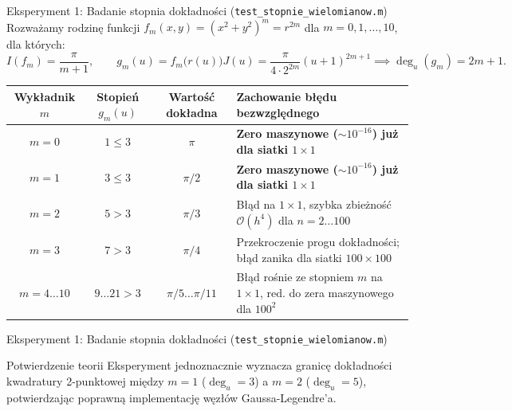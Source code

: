 \documentclass[aspectratio=169, 10pt, xcolor={table}]{beamer}
\begin{document}
\begin{frame}{Eksperyment 1: Badanie stopnia dokładności (\texttt{test\_stopnie\_wielomianow.m})}
  Rozważamy rodzinę funkcji $f_m(x,y) = (x^2 + y^2)^m = r^{2m}$ dla $m = 0, 1, \dots, 10$, dla których:
  \[
    I(f_m) = \frac{\pi}{m + 1}, \qquad g_m(u) = f_m\big(r(u)\big)J(u) = \frac{\pi}{4 \cdot 2^{2m}}(u+1)^{2m+1} \implies \deg_u(g_m) = 2m + 1.
  \]

  \begin{table}
  \centering
  \footnotesize
  \setlength{\tabcolsep}{4pt}
  \begin{tabular}{@{} c c c >{\raggedright\arraybackslash}p{6.2cm} @{}}
    \toprule
    \textbf{Wykładnik $m$} & \textbf{Stopień $g_m(u)$} & \textbf{Wartość dokładna} & \textbf{Zachowanie błędu bezwzględnego} \\
    \midrule
    \rowcolor{RowHighlight}
    $m = 0$ & $1 \le 3$ & $\pi$ & \textbf{Zero maszynowe ($\sim 10^{-16}$) już dla siatki $1 \times 1$} \\
    \rowcolor{RowHighlight}
    $m = 1$ & $3 \le 3$ & $\pi / 2$ & \textbf{Zero maszynowe ($\sim 10^{-16}$) już dla siatki $1 \times 1$} \\
    $m = 2$ & $5 > 3$ & $\pi / 3$ & Błąd na $1 \times 1$, szybka zbieżność $\mathcal{O}(h^4)$ dla $n = 2 \dots 100$ \\
    $m = 3$ & $7 > 3$ & $\pi / 4$ & Przekroczenie progu dokładności; błąd zanika dla siatki $100 \times 100$ \\
    $m = 4 \dots 10$ & $9 \dots 21 > 3$ & $\pi/5 \dots \pi/11$ & Błąd rośnie ze stopniem $m$ na $1\times 1$, red. do zera maszynowego dla $100^2$ \\
    \bottomrule
  \end{tabular}
\end{table}
\end{frame}
\begin{frame}{Eksperyment 1: Badanie stopnia dokładności (\texttt{test\_stopnie\_wielomianow.m})}
  \begin{exampleblock}{Potwierdzenie teorii}
    Eksperyment jednoznacznie wyznacza granicę dokładności kwadratury 2-punktowej między $m = 1$ ($\deg_u = 3$) a $m = 2$ ($\deg_u = 5$), potwierdzając poprawną implementację węzłów Gaussa-Legendre'a.
  \end{exampleblock}
\end{frame}
\end{document}
